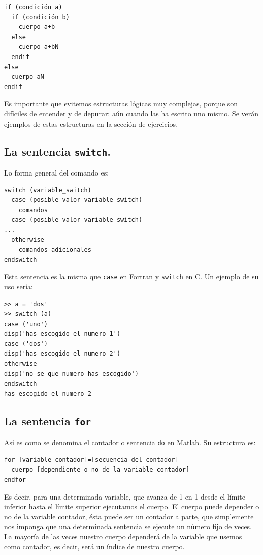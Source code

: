 \begin{verbatim}
if (condición a)   
  if (condición b)   
    cuerpo a+b   
  else   
    cuerpo a+bN   
  endif   
else   
  cuerpo aN   
endif
\end{verbatim}
Es importante que evitemos estructuras lógicas muy complejas, porque
son difíciles de entender y de depurar; aún cuando las ha escrito uno
mismo. Se verán ejemplos de estas estructuras en la sección de
ejercicios.


\subsection{La sentencia \texttt{switch}.}
Lo forma general del comando es:

\begin{verbatim}
switch (variable_switch)
  case (posible_valor_variable_switch)
    comandos
  case (posible_valor_variable_switch)
...
  otherwise
    comandos adicionales
endswitch
\end{verbatim}
Esta sentencia es la misma que \texttt{case} en Fortran y
\texttt{switch} en C. Un ejemplo de su uso sería:

\begin{verbatim}
>> a = 'dos'
>> switch (a)
case ('uno')
disp('has escogido el numero 1')
case ('dos')
disp('has escogido el numero 2')
otherwise
disp('no se que numero has escogido')
endswitch
has escogido el numero 2
\end{verbatim}

\subsection{La sentencia \texttt{for}}

Así es como se denomina el contador o sentencia \texttt{do} en Matlab.
Su estructura es:

  \begin{verbatim}
for [variable contador]=[secuencia del contador]
  cuerpo [dependiente o no de la variable contador]
endfor 
\end{verbatim}
Es decir, para una determinada variable, que avanza de 1 en 1 desde el
límite inferior hasta el límite superior ejecutamos el cuerpo.  El
cuerpo puede depender o no de la variable contador, ésta puede ser un
contador a parte, que simplemente nos imponga que una determinada
sentencia se ejecute un número fijo de veces. La mayoría de las veces
nuestro cuerpo dependerá de la variable que usemos como contador, es
decir, será un índice de nuestro cuerpo.

